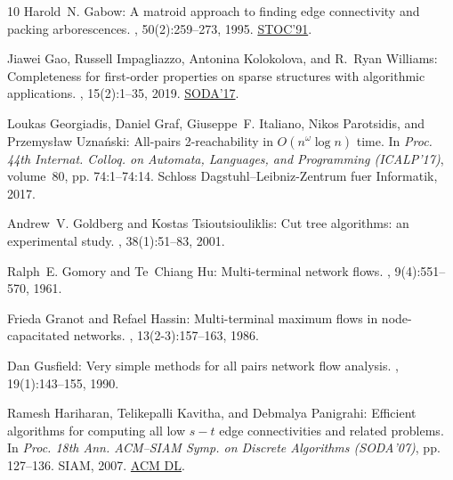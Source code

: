 \begin{thebibliography}{10}
{\sc Harold~N. Gabow}: A matroid approach to finding edge connectivity and
  packing arborescences.
, 50(2):259--273, 1995.
\newblock \prelim \href{https:/doi.org/10.1145/103418.103436}{STOC'91}.

{\sc Jiawei Gao, Russell Impagliazzo, Antonina Kolokolova, and R.~Ryan
  Williams}: Completeness for first-order properties on sparse structures with
  algorithmic applications.
, 15(2):1--35, 2019.
\newblock \prelim \href{https://doi.org/10.1137/1.9781611974782.141}{SODA'17}.
\newblock [\epfmtdoi{10.1145/3196275}]

{\sc Loukas Georgiadis, Daniel Graf, Giuseppe~F. Italiano, Nikos Parotsidis,
  and Przemys{\l}aw Uzna{\'n}ski}: All-pairs 2-reachability in
  ${O}(n^\omega\log n)$ time.
\newblock In {\em Proc. 44th Internat. Colloq. on Automata, Languages, and
  Programming (ICALP'17)}, volume~80, pp. 74:1--74:14. Schloss
  Dagstuhl--Leibniz-Zentrum fuer Informatik, 2017.

{\sc Andrew~V. Goldberg and Kostas Tsioutsiouliklis}: Cut tree algorithms: an
  experimental study.
, 38(1):51--83, 2001.

{\sc Ralph~E. Gomory and Te~Chiang Hu}: Multi-terminal network flows.
, 9(4):551--570, 1961.
\newblock [\epfmtdoi{10.1137/0109047}]

{\sc Frieda Granot and Refael Hassin}: Multi-terminal maximum flows in
  node-capacitated networks.
, 13(2-3):157--163, 1986.
\newblock [\epfmtdoi{10.1016/0166-218X(86)90079-X}]

{\sc Dan Gusfield}: Very simple methods for all pairs network flow analysis.
, 19(1):143--155, 1990.
\newblock [\epfmtdoi{10.1137/0219009}]

{\sc Ramesh Hariharan, Telikepalli Kavitha, and Debmalya Panigrahi}: Efficient
  algorithms for computing all low $s-t$ edge connectivities and related
  problems.
\newblock In {\em Proc. 18th Ann. ACM--SIAM Symp. on Discrete Algorithms
  (SODA'07)}, pp. 127--136. SIAM, 2007.
\newblock \href{http://dl.acm.org/citation.cfm?id=1283383.1283398}{ACM DL}.


\end{thebibliography}
